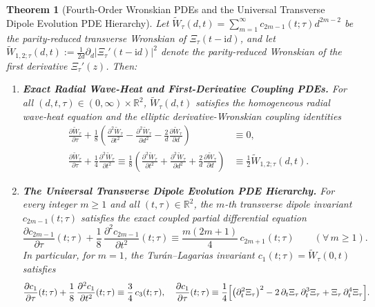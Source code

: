 \documentclass[11pt,reqno]{amsart}
\newtheorem{theorem}{Theorem}[section]
\theoremstyle{definition}
\theoremstyle{remark}
\numberwithin{equation}{section}
\newcommand{\R}{\mathbb{R}}
\newcommand{\ii}{\mathrm{i}}
\begin{document}
\begin{theorem}[Fourth-Order Wronskian PDEs and the Universal Transverse Dipole Evolution PDE Hierarchy]\label{thm:dipole_hierarchy}
Let $\widetilde{W}_\tau(d,t) = \sum_{m=1}^\infty c_{2m-1}(t;\tau)d^{2m-2}$ be the parity-reduced transverse Wronskian of $\Xi_\tau(t-\ii d)$, and let $\widetilde{W}_{1,2;\tau}(d,t) := \frac{1}{2d}\partial_d|\Xi_\tau'(t-\ii d)|^2$ denote the parity-reduced Wronskian of the first derivative $\Xi_\tau'(z)$. Then:
\begin{enumerate}[label=\textup{(\roman*)},leftmargin=2.2em]
\item \textbf{Exact Radial Wave-Heat and First-Derivative Coupling PDEs.} For all $(d, t, \tau) \in (0, \infty) \times \R^2$, $\widetilde{W}_\tau(d,t)$ satisfies the homogeneous radial wave-heat equation and the elliptic derivative-Wronskian coupling identities
\begin{equation}\label{eq:wtilde_radial_pdes}
\begin{aligned}
\frac{\partial \widetilde{W}_\tau}{\partial\tau} + \frac{1}{8}\left(\frac{\partial^2\widetilde{W}_\tau}{\partial t^2} - \frac{\partial^2\widetilde{W}_\tau}{\partial d^2} - \frac{2}{d}\frac{\partial\widetilde{W}_\tau}{\partial d}\right) &\equiv 0, \\
\frac{\partial \widetilde{W}_\tau}{\partial\tau} + \frac{1}{4}\frac{\partial^2\widetilde{W}_\tau}{\partial t^2} \equiv \frac{1}{8}\left(\frac{\partial^2\widetilde{W}_\tau}{\partial t^2} + \frac{\partial^2\widetilde{W}_\tau}{\partial d^2} + \frac{2}{d}\frac{\partial\widetilde{W}_\tau}{\partial d}\right) &\equiv \frac{1}{2}\widetilde{W}_{1,2;\tau}(d,t).
\end{aligned}
\end{equation}
\item \textbf{The Universal Transverse Dipole Evolution PDE Hierarchy.} For every integer $m \ge 1$ and all $(t, \tau) \in \R^2$, the $m$-th transverse dipole invariant $c_{2m-1}(t;\tau)$ satisfies the exact coupled partial differential equation
\begin{equation}\label{eq:universal_dipole_hierarchy}
\frac{\partial c_{2m-1}}{\partial\tau}(t;\tau) + \frac{1}{8}\,\frac{\partial^2 c_{2m-1}}{\partial t^2}(t;\tau) \equiv \frac{m(2m+1)}{4}\,c_{2m+1}(t;\tau) \qquad (\forall\, m \ge 1).
\end{equation}
In particular, for $m = 1$, the Tur\'an--Lagarias invariant $c_1(t;\tau) = \widetilde{W}_\tau(0,t)$ satisfies
\begin{equation}\label{eq:c1_c3_pde}
\frac{\partial c_1}{\partial\tau}(t;\tau) + \frac{1}{8}\,\frac{\partial^2 c_1}{\partial t^2}(t;\tau) \equiv \frac{3}{4}\,c_3(t;\tau), \quad \frac{\partial c_1}{\partial\tau}(t;\tau) \equiv \frac{1}{4}\Bigl[\bigl(\partial_t^2\Xi_\tau\bigr)^2 - 2\,\partial_t\Xi_\tau\,\partial_t^3\Xi_\tau + \Xi_\tau\,\partial_t^4\Xi_\tau\Bigr].
\end{equation}
\end{enumerate}
\end{theorem}
\end{document}
